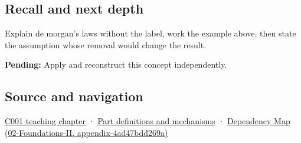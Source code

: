 \subsection{Recall and next depth}\label{appendix-9079d3659da4-recall-and-next-depth}

Explain de morgan's laws without the label, work the example above, then state the assumption whose removal would change the result.

\textbf{Pending:} Apply and reconstruct this concept independently.

\subsection{Source and navigation}\label{appendix-9079d3659da4-source-and-navigation}

\hyperref[01-foundations-i-ch001-from-a-signal-to-an-interpretation]{C001 teaching chapter} · \hyperref[appendix-fd090d982a15]{Part definitions and mechanisms} · \href{../02-Foundations-II/main.pdf\#nameddest=appendix-4ad47bdd269a}{Dependency Map (02-Foundations-II, appendix-4ad47bdd269a)}
